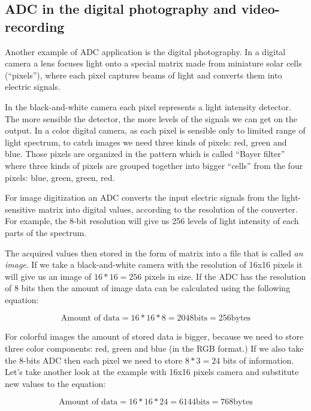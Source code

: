 \documentclass[../sparc.tex]{subfiles}
\begin{document}
\subsection{ADC in the digital photography and video-recording}


Another example of \gls{ADC} application is the digital photography.  In a
digital camera a lens focuses light onto a special matrix made from miniature
solar cells (``pixels''), where each pixel captures beams of light and converts
them into electric signals. \cite{expertphotography}

In the black-and-white camera each pixel represents a light intensity detector.
The more sensible the detector, the more levels of the signals we can get on the
output.  In a color digital camera, as each pixel is sensible only to limited
range of light spectrum, to catch images we need three kinds of pixels: red,
green and blue.  Those pixels are organized in the pattern which is called
``Bayer filter'' where three kinds of pixels are grouped together into bigger
``cells'' from the four pixels: blue, green, green, red.

For image digitization an ADC converts the input electric signals from the
light-sensitive matrix into digital values, according to the resolution of the
converter.  For example, the 8-bit resolution will give us 256 levels of light
intensity of each parts of the spectrum.

The acquired values then stored in the form of matrix into a file that is called
\emph{an image}.  If we take a black-and-white camera with the resolution of
16x16 pixels it will give us an image of $16 * 16 = 256$ pixels in size.  If the
ADC has the resolution of 8 bits then the amount of image data can be calculated using the following equation:

\begin{equation}
  \mbox{Amount of data} = 16 * 16 * 8 = 2048 \mbox{bits} = 256 \mbox{bytes}
  \label{equation:adc-image-0}
\end{equation}

For colorful images the amount of stored data is bigger, because we need to
store three color components: red, green and blue (in the RGB format.)  If we
also take the 8-bits ADC then each pixel we need to store $8 * 3 = 24$ bits of
information.  Let's take another look at the example with 16x16 pixels camera
and substitute new values to the equation:

\begin{equation}
  \mbox{Amount of data} = 16 * 16 * 24 = 6144 \mbox{bits} = 768 \mbox{bytes}
  \label{equation:adc-image-1}
\end{equation}
\end{document}
